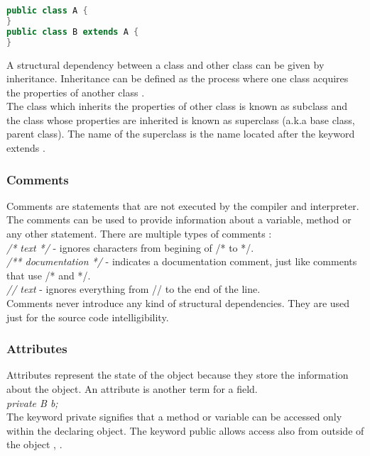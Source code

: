 \begin{lstlisting}[language=java, caption={Class declaration.}]
public class A {
}
public class B extends A {
}
\end{lstlisting}

A structural dependency between a class and other class can be given by inheritance. Inheritance can be defined as the process where one class acquires the properties of another class \cite{oopconcept} .\\
The class which inherits the properties of other class is known as subclass and the class whose properties are inherited is known as superclass (a.k.a base class, parent class). The name of the superclass is the name located after the keyword extends .

\subsubsection{Comments}
Comments are statements that are not executed by the compiler and interpreter. The comments can be used to provide information about a variable, method or any other statement. There are multiple types of comments :\\

\textit{/* text */} -  ignores characters from begining of /* to */.\\
\textit{/** documentation */} -  indicates a documentation comment, just like comments that use /* and */.\\
\textit{// text} -  ignores everything from // to the end of the line.\\ 

Comments never introduce any kind of structural dependencies. They are used just for the source code intelligibility.

\subsubsection{Attributes}

Attributes represent the state of the object because they store the information about the object. An attribute is another term for a field. \\

\textit{private B b;}\\
The keyword private signifies that a method or variable can be accessed only within the declaring object. The keyword public allows access also from outside of the object \cite{oop2}, \cite{ct11} .

